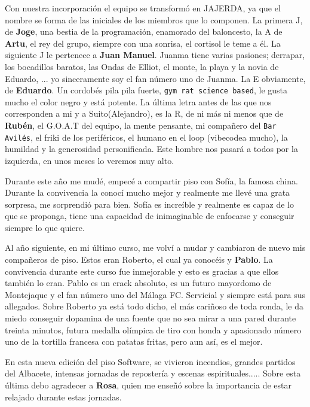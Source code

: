 \documentclass[12pt,a4paper,twoside,openright]{book}
\begin{document}
\begin{umaacknowledgments}
    Con nuestra incorporación el equipo se transformó en JAJERDA, ya que el nombre se forma de las iniciales de los miembros que lo componen. La primera J, de \textbf{Joge}, una bestia de la programación, enamorado del baloncesto, la A de \textbf{Artu}, el rey del grupo, siempre con una sonrisa, el cortisol le teme a él. La siguiente J le pertenece a \textbf{Juan Manuel}. Juanma tiene varias pasiones; derrapar, los bocadillos baratos, las Ondas de Elliot, el monte, la playa y la novia de Eduardo, ... yo sinceramente soy el fan número uno de Juanma. La E obviamente, de \textbf{Eduardo}. Un cordobés pila pila fuerte, \texttt{gym rat science based}, le gusta mucho el color negro y está potente. La última letra antes de las que nos corresponden a mi y a Suito(Alejandro), es la R, de ni más ni menos que de \textbf{Rubén}, el G.O.A.T del equipo, la mente pensante, mi compañero del \texttt{Bar Avilés}, el friki de los periféricos, el humano en el loop (vibecodea mucho), la humildad y la generosidad personificada. Este hombre nos pasará a todos por la izquierda, en unos meses lo veremos muy alto. 

    Durante este año me mudé, empecé a compartir piso con Sofía, la famosa china. Durante la convivencia la conocí mucho mejor y realmente me llevé una grata sorpresa, me sorprendió para bien. Sofía es increíble y realmente es capaz de lo que se proponga, tiene una capacidad de inimaginable de enfocarse y conseguir siempre lo que quiere.

    Al año siguiente, en mi último curso, me volví a mudar y cambiaron de nuevo mis compañeros de piso. Estos eran Roberto, el cual ya conocéis y \textbf{Pablo}. La convivencia durante este curso fue inmejorable y esto es gracias a que ellos también lo eran. Pablo es un crack absoluto, es un futuro mayordomo de Montejaque y el fan número uno del Málaga FC. Servicial y siempre está para sus allegados. Sobre Roberto ya está todo dicho, el más cariñoso de toda ronda, le da miedo conseguir dopamina de una fuente que no sea mirar a una pared durante treinta minutos, futura medalla olímpica de tiro con honda y apasionado número uno de la tortilla francesa con patatas fritas, pero aun así, es el mejor. 
    
    En esta nueva edición del piso Software, se vivieron incendios, grandes partidos del Albacete, intensas jornadas de repostería y escenas espirituales..... Sobre esta última debo agradecer a \textbf{Rosa}, quien me enseñó sobre la importancia de estar relajado durante estas jornadas.


\end{umaacknowledgments}
\end{document}
